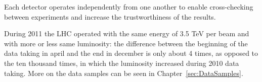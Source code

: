 Each detector operates independently from one another to enable cross-checking between experiments and increase the trustworthiness of the results.

During 2011 the LHC operated with the same energy of 3.5 TeV per beam and with more or less same luminosity: the difference between the beginning of the data taking in april and the end in december is only about 4 times, as opposed to the ten thousand times, in which the luminosity increased during 2010 data taking. More on the data samples can be seen in Chapter~\ref{sec:DataSamples}.
